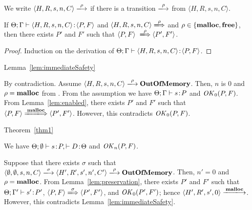 
We write \(\langle H, R, s, n, C \rangle \xlongrightarrow{\rho}\) if
there is a transition \(\xlongrightarrow{\rho}\) from \(\langle H, R,
s, n, C \rangle\).

\begin{lemma}
\label{lem:enabled}
If \(\Theta; \Gamma \vdash \langle H, R, s, n, C \rangle \!:\! \langle
P,F \rangle\) and \(\langle H, R, s, n, C \rangle
\xLongrightarrow{\rho}\) and \(\rho \in \{\mathbf{malloc}, \mathbf{free}\}\), then
there exists \(P'\) and \(F'\) such that \( \langle P, F \rangle
\ \xLongrightarrow{\rho} \langle P', F'\rangle\).
\end{lemma}

\begin{proof}
Induction on the derivation of \(\Theta; \Gamma \vdash \langle H, R, s, n, C \rangle \!:\! \langle P, F \rangle\).
\end{proof}

\begin{pfof}{Lemma~\ref{lem:immediateSafety}}

By contradiction.  Assume \(\langle H, R, s, n, C \rangle
\xlongrightarrow{\rho} \OVERFLOW\). Then, \(n\) is \(0\) and \(\rho =
\mathbf{malloc}\) from .  From the assumption we have
\(\Theta;\Gamma \vdash s \!:\! P\) and \(\mathit{OK}_0(P, F)\).  From
Lemma~\ref{lem:enabled}, there exists \(P'\) and \(F'\) such that \(
\langle P, F \rangle \xLongrightarrow{\Malloc} \langle P', F'
\rangle\).  However, this contradicts \(\mathit{OK}_0(P, F)\).

\end{pfof}

\begin{pfof}{Theorem~\ref{thm1}}

We have \(\Theta;\emptyset \vdash s\!:\! P, \vdash D\!:\! \Theta\) and
\(\mathit{OK}_n(P, F)\).

Suppose that there exists \(\sigma\) such that \(\langle \emptyset,
\emptyset, s, n, C\rangle \xlongrightarrow{\sigma} \langle H', R', s',
n', C'\rangle \xlongrightarrow{\rho} \OVERFLOW\).  Then, \(n' = 0\)
and \(\rho = \mathbf{malloc}\).  From Lemma~\ref{lem:preservation}, there
exists \(P'\) and \(F'\) such that \(\Theta; \Gamma' \vdash s' \!:\!
P'\), \( \langle P, F \rangle \xLongrightarrow{\sigma} \langle P', F'
\rangle \), and \(\mathit{OK}_0(P', F')\); hence \(\langle H', R', s',
0\rangle \xlongrightarrow{\Malloc}\).  However, this contradicts
Lemma~\ref{lem:immediateSafety}.

\end{pfof}
